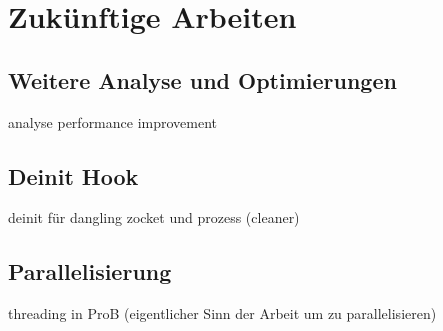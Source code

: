 

\section{Zukünftige Arbeiten}

\subsection{Weitere Analyse und Optimierungen}

    analyse performance improvement

\subsection{Deinit Hook}

 deinit für dangling zocket und prozess (cleaner)

\subsection{Parallelisierung}

 threading in ProB (eigentlicher Sinn der Arbeit um zu parallelisieren)
